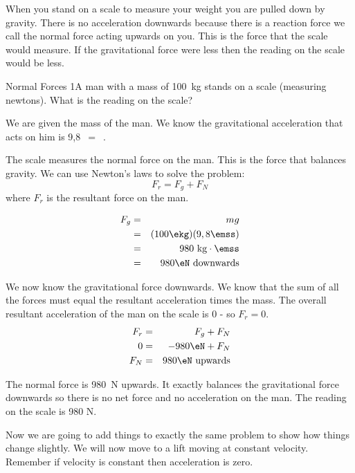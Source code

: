 When you stand on a scale to measure your weight you are pulled down by gravity. There is no acceleration downwards because there is a reaction force we call the normal force acting upwards on you. This is the force that the scale would measure. If the gravitational force were less then the reading on the scale would be less.
\vspace{.5cm}
\begin{wex}{Normal Forces 1}{A man with a mass of 100~kg stands on a scale
(measuring newtons). What is the reading on the scale?}{ We are given the mass of the man. We know the gravitational acceleration that acts on him is 9,8~$=$~\mss .

The scale measures the normal force on the man. This is the force that
balances gravity. We can use Newton's laws to solve the problem:
\begin{equation*}
F_r=F_g+F_N
\end{equation*}
where $F_r$ is the resultant force on the man.

\begin{eqnarray*}
F_g&=&mg \\
&=& (100\ekg)(9,8\emss)\\
&=& 980\ \mathrm{kg\cdot\emss} \\
&=& 980\eN\ \mathrm{downwards}
\end{eqnarray*}

We now know the gravitational force downwards. We know that the sum of all the forces must equal the resultant acceleration times the mass. The overall resultant acceleration of the man on the scale is $0$ - so $F_r=0$.
\begin{eqnarray*}
F_r&=&F_g+F_N \\
0 &=& -980\eN+F_N\\
F_N &=& 980\eN\ \mathrm{upwards}
\end{eqnarray*}

The normal force is 980~N upwards. It exactly balances the gravitational force downwards so there is no net force and no acceleration on the man. The reading on the scale is 980 N.}
\end{wex}

Now we are going to add things to exactly the same problem to show how things change slightly. We will now move to a lift moving at constant velocity. Remember if velocity is constant then acceleration is zero.

